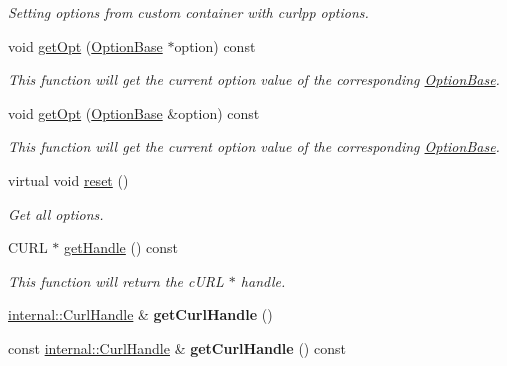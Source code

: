 \begin{DoxyCompactItemize}
\begin{DoxyCompactList}\small\item\em Setting options from custom container with curlpp options. \end{DoxyCompactList}\item 
void \hyperlink{classcurlpp_1_1Easy_afb31f0536e0767f0016ed04fdb935b21}{get\-Opt} (\hyperlink{classcurlpp_1_1OptionBase}{Option\-Base} $\ast$option) const 
\begin{DoxyCompactList}\small\item\em This function will get the current option value of the corresponding \hyperlink{classcurlpp_1_1OptionBase}{Option\-Base}. \end{DoxyCompactList}\item 
void \hyperlink{classcurlpp_1_1Easy_a9103b1438874709c1ec42f430173edaf}{get\-Opt} (\hyperlink{classcurlpp_1_1OptionBase}{Option\-Base} \&option) const 
\begin{DoxyCompactList}\small\item\em This function will get the current option value of the corresponding \hyperlink{classcurlpp_1_1OptionBase}{Option\-Base}. \end{DoxyCompactList}\item 
\hypertarget{classcurlpp_1_1Easy_a2e9dcb9179225771a28e6acda748b750}{virtual void \hyperlink{classcurlpp_1_1Easy_a2e9dcb9179225771a28e6acda748b750}{reset} ()}\label{classcurlpp_1_1Easy_a2e9dcb9179225771a28e6acda748b750}

\begin{DoxyCompactList}\small\item\em Get all options. \end{DoxyCompactList}\item 
C\-U\-R\-L $\ast$ \hyperlink{classcurlpp_1_1Easy_af40b3ee39a944a728599176e9dece30e}{get\-Handle} () const 
\begin{DoxyCompactList}\small\item\em This function will return the c\-U\-R\-L $\ast$ handle. \end{DoxyCompactList}\item 
\hypertarget{classcurlpp_1_1Easy_acf38b0fd04b0b02fded31849f87bea43}{\hyperlink{classcurlpp_1_1internal_1_1CurlHandle}{internal\-::\-Curl\-Handle} \& {\bfseries get\-Curl\-Handle} ()}\label{classcurlpp_1_1Easy_acf38b0fd04b0b02fded31849f87bea43}

\item 
\hypertarget{classcurlpp_1_1Easy_a49fbfde3465fdd5f51a89f3e012fa6bb}{const \hyperlink{classcurlpp_1_1internal_1_1CurlHandle}{internal\-::\-Curl\-Handle} \& {\bfseries get\-Curl\-Handle} () const }\label{classcurlpp_1_1Easy_a49fbfde3465fdd5f51a89f3e012fa6bb}

\end{DoxyCompactItemize}
